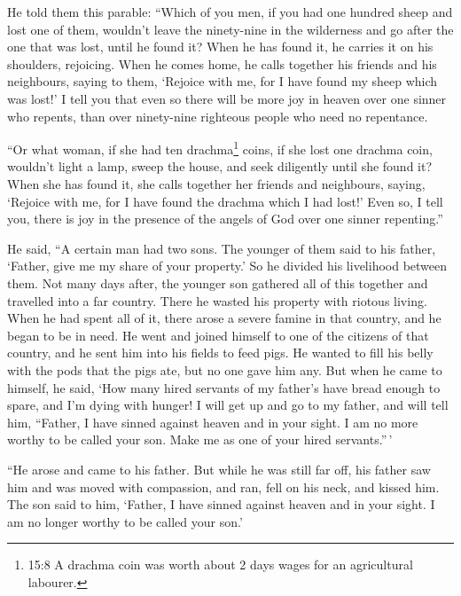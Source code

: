  He told them this parable:  ``Which of you men,
if you had one hundred sheep and lost one of them, wouldn't leave the
ninety-nine in the wilderness and go after the one that was lost, until
he found it?  When he has found it, he carries it on his
shoulders, rejoicing.  When he comes home, he calls together
his friends and his neighbours, saying to them, `Rejoice with me, for I
have found my sheep which was lost!'  I tell you that even
so there will be more joy in heaven over one sinner who repents, than
over ninety-nine righteous people who need no repentance.

 ``Or what woman, if she had ten drachma\footnote{15:8 A
  drachma coin was worth about 2 days wages for an agricultural
  labourer.} coins, if she lost one drachma coin, wouldn't light a lamp,
sweep the house, and seek diligently until she found it? 
When she has found it, she calls together her friends and neighbours,
saying, `Rejoice with me, for I have found the drachma which I had
lost!'  Even so, I tell you, there is joy in the presence
of the angels of God over one sinner repenting.''

 He said, ``A certain man had two sons.  The
younger of them said to his father, `Father, give me my share of your
property.' So he divided his livelihood between them.  Not
many days after, the younger son gathered all of this together and
travelled into a far country. There he wasted his property with riotous
living.  When he had spent all of it, there arose a severe
famine in that country, and he began to be in need.  He
went and joined himself to one of the citizens of that country, and he
sent him into his fields to feed pigs.  He wanted to fill
his belly with the pods that the pigs ate, but no one gave him any.
 But when he came to himself, he said, `How many hired
servants of my father's have bread enough to spare, and I'm dying with
hunger!  I will get up and go to my father, and will tell
him, ``Father, I have sinned against heaven and in your sight.
 I am no more worthy to be called your son. Make me as one
of your hired servants.''\,'

 ``He arose and came to his father. But while he was still
far off, his father saw him and was moved with compassion, and ran, fell
on his neck, and kissed him.  The son said to him, `Father,
I have sinned against heaven and in your sight. I am no longer worthy to
be called your son.'

